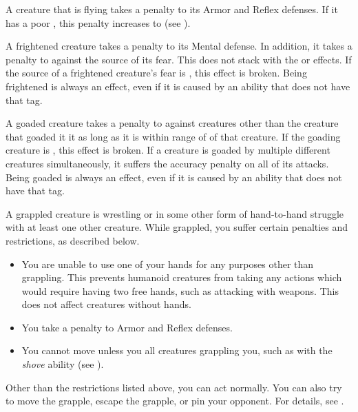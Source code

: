      A creature that is flying takes a  penalty to its Armor and Reflex defenses.
    If it has a poor , this penalty increases to  (see ).

     A frightened creature takes a  penalty to its Mental defense.
    In addition, it takes a  penalty to  against the source of its fear.
    This does not stack with the \shaken or \panicked effects.
    If the source of a frightened creature's fear is , this effect is broken.
    Being frightened is always an  effect, even if it is caused by an ability that does not have that tag.

     A goaded creature takes a  penalty to  against creatures other than the creature that goaded it it as long as it is within \rngmed range of of that creature.
    If the goading creature is , this effect is broken.
    If a creature is goaded by multiple different creatures simultaneously, it suffers the accuracy penalty on all of its attacks.
    Being goaded is always an  effect, even if it is caused by an ability that does not have that tag.

     A grappled creature is wrestling or in some other form of hand-to-hand struggle with at least one other creature.
    While grappled, you suffer certain penalties and restrictions, as described below.
    \begin{itemize}
        \item You are unable to use one of your hands for any purposes other than grappling.
            This prevents humanoid creatures from taking any actions which would require having two free hands, such as attacking with  weapons.
            This does not affect creatures without hands.
        \item You take a  penalty to Armor and Reflex defenses.
        \item You cannot move unless you  all creatures grappling you, such as with the \textit{shove} ability (see ).
    \end{itemize}

    Other than the restrictions listed above, you can act normally. You can also try to move the grapple, escape the grapple, or pin your opponent. For details, see .


